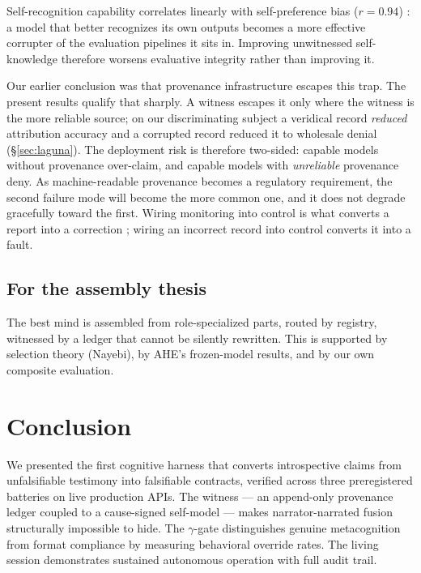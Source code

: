 \documentclass[11pt]{article}
\begin{document}
Self-recognition capability correlates linearly with self-preference bias
($r = 0.94$) \citep{panickssery2024}: a model that better recognizes its own
outputs becomes a more effective corrupter of the evaluation pipelines it
sits in. Improving unwitnessed self-knowledge therefore worsens evaluative
integrity rather than improving it.

Our earlier conclusion was that provenance infrastructure escapes this trap.
The present results qualify that sharply. A witness escapes it only where the
witness is the more reliable source; on our discriminating subject a
veridical record \emph{reduced} attribution accuracy and a corrupted record
reduced it to wholesale denial (\S\ref{sec:laguna}). The deployment risk is
therefore two-sided: capable models without provenance over-claim, and
capable models with \emph{unreliable} provenance deny. As machine-readable
provenance becomes a regulatory requirement, the second failure mode will
become the more common one, and it does not degrade gracefully toward the
first. Wiring monitoring into control is what converts a report into a
correction \citep{cao2026}; wiring an incorrect record into control converts
it into a fault.

\subsection{For the assembly thesis}

The best mind is assembled from role-specialized parts, routed by
registry, witnessed by a ledger that cannot be silently rewritten. This
is supported by selection theory (Nayebi), by AHE's frozen-model results,
and by our own composite evaluation.

\section{Conclusion}\label{sec:conclusion}

We presented the first cognitive harness that converts introspective
claims from unfalsifiable testimony into falsifiable contracts, verified
across three preregistered batteries on live production APIs. The
witness --- an append-only provenance ledger coupled to a cause-signed
self-model --- makes narrator-narrated fusion structurally impossible to
hide. The $\gamma$-gate distinguishes genuine metacognition from format
compliance by measuring behavioral override rates. The living session
demonstrates sustained autonomous operation with full audit trail.
\end{document}
